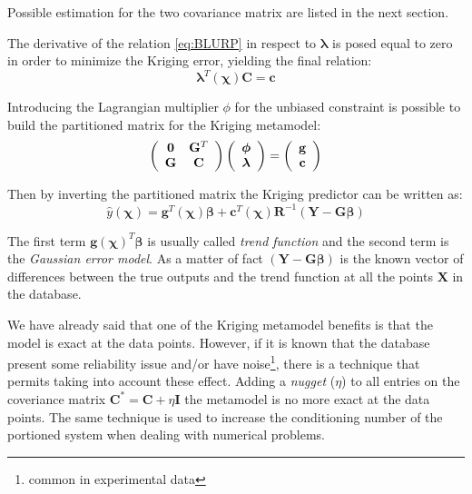Possible estimation for the two covariance matrix are listed in the next section.

The derivative of the relation \eqref{eq:BLURP} in respect to $\boldsymbol{ \lambda}$ is posed equal to zero in order to minimize the Kriging error, yielding the final relation:
\begin{equation}
\boldsymbol{\lambda}^T(\boldsymbol{\chi}) \mathbf{C} = \mathbf{c}
\end{equation}

Introducing the Lagrangian multiplier $\phi$ for the unbiased constraint is possible to build the partitioned matrix for the Kriging metamodel:
\begin{equation}
\left(
\begin{array}{c c}
\mathbf{0} & \mathbf{G}^T \\
\mathbf{G} & \mathbf{C}
\end{array}
\right)  \left( 
\begin{array}{c}
\boldsymbol{\phi} \\
\boldsymbol{\lambda}
\end{array}
\right) = \left( 
\begin{array}{c}
\mathbf{g} \\
\mathbf{c}
\end{array}
\right)
\end{equation}

Then by inverting the partitioned matrix the Kriging predictor can be written as:
\begin{equation}
\hat{y}(\boldsymbol{\chi}) = \mathbf{g}^T(\boldsymbol{\chi}) \boldsymbol{\beta} + \mathbf{c}^T(\boldsymbol{\chi}) \mathbf{R}^{-1} \left( \mathbf{Y} - \mathbf{G}\boldsymbol{\beta} \right)
\end{equation}

The first term $\mathbf{g}(\boldsymbol{\chi})^T \boldsymbol{\beta}$ is usually called \textit{trend function} and the second term is the \textit{Gaussian error model}. As a matter of fact $\left( \mathbf{Y} - \mathbf{G}\boldsymbol{\beta} \right)$ is the known vector of differences between the true outputs and the trend function at all the points $\mathbf{X}$ in the database.

We have already said that one of the Kriging metamodel benefits is that the model is exact at the data points. However, if it is known that the database present some reliability issue and/or have noise\footnote{common in experimental data}, there is a technique that permits taking into account these effect.
Adding a \textit{nugget} ($\eta$) to all entries on the coveriance matrix $\mathbf{C}^* = \mathbf{C} + \eta \mathbf{I}$ the metamodel is no more exact at the data points. The same technique is used to increase the conditioning number of the portioned system when dealing with numerical problems.

